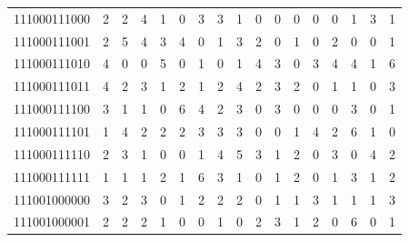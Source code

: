 \documentclass[10pt,a4paper]{article}
\begin{document}
\begin{longtable}{ |c|c|c|c|c|c|c|c|c|c|c|c|c|c|c|c|c| }
    111000111000              & 2                            & 2                                & 4                            & 1                              & 0   & 3   & 3   & 1   & 0   & 0   & 0   & 0   & 0   & 1   & 3   & 1   \\
    111000111001              & 2                            & 5                                & 4                            & 3                              & 4   & 0   & 1   & 3   & 2   & 0   & 1   & 0   & 2   & 0   & 0   & 1   \\
    111000111010              & 4                            & 0                                & 0                            & 5                              & 0   & 1   & 0   & 1   & 4   & 3   & 0   & 3   & 4   & 4   & 1   & 6   \\
    111000111011              & 4                            & 2                                & 3                            & 1                              & 2   & 1   & 2   & 4   & 2   & 3   & 2   & 0   & 1   & 1   & 0   & 3   \\
    111000111100              & 3                            & 1                                & 1                            & 0                              & 6   & 4   & 2   & 3   & 0   & 3   & 0   & 0   & 0   & 3   & 0   & 1   \\
    111000111101              & 1                            & 4                                & 2                            & 2                              & 2   & 3   & 3   & 3   & 0   & 0   & 1   & 4   & 2   & 6   & 1   & 0   \\
    111000111110              & 2                            & 3                                & 1                            & 0                              & 0   & 1   & 4   & 5   & 3   & 1   & 2   & 0   & 3   & 0   & 4   & 2   \\
    111000111111              & 1                            & 1                                & 1                            & 2                              & 1   & 6   & 3   & 1   & 0   & 1   & 2   & 0   & 1   & 3   & 1   & 2   \\
    111001000000              & 3                            & 2                                & 3                            & 0                              & 1   & 2   & 2   & 2   & 0   & 1   & 1   & 3   & 1   & 1   & 1   & 3   \\
    111001000001              & 2                            & 2                                & 2                            & 1                              & 0   & 0   & 1   & 0   & 2   & 3   & 1   & 2   & 0   & 6   & 0   & 1   \\

\end{longtable}
\end{document}
